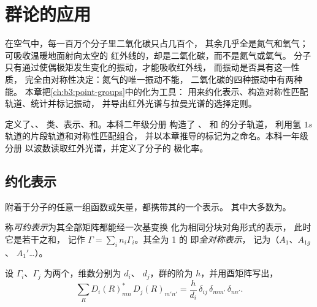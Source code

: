 \chapter{群论的应用}\label{ch:b3:group-theory-applied}

在空气中，每一百万个分子里二氧化碳只占几百个，
其余几乎全是氮气和氧气；可吸收温暖地面射向太空的
红外线的，却是二氧化碳，而不是氮气或氧气。
分子只有通过使偶极矩发生变化的振动，才能吸收红外线，
而振动是否具有这一性质，
完全由对称性决定：氮气的唯一振动不能，
二氧化碳的四种振动中有两种能。
本章把\cref{ch:b3:point-groups}中的化为工具：
用来约化表示、构造对称性匹配轨道、统计并标记振动，
并导出红外光谱与拉曼光谱的选择定则。

\begin{recall}
定义了、、
类、表示、和。本科二年级分册
构造了 、 和  的分子轨道，
利用氢 $1s$ 轨道的片段轨道和对称性匹配组合，
并以本章推导的标记为之命名。本科一年级分册
以波数读取红外光谱，并定义了分子的
极化率。
\end{recall}

\section{约化表示}

附着于分子的任意一组函数或矢量，都携带其的一个表示。
其中大多数为。

\begin{definition}\label{def:b3:group-theory-applied:reducible}
称\emph{可约表示}为其全部矩阵都能经一次基变换
化为相同分块对角形式的表示，
此时它是若干之和，
记作 $\Gamma = \sum_in_i\Gamma_i$。其全为 1 的
即\emph{全对称表示}，
记为（$A_1$、$A_{1g}$、
$A_1'$\dots）。
\end{definition}

\begin{theorem}[大正交定理]\label{thm:b3:group-theory-applied:great-orthogonality}
设 $\Gamma_i$、$\Gamma_j$ 为两个，维数分别为 $d_i$、
$d_j$，群的阶为 $h$，并用酉矩阵写出，
\[
\sum_R D_i(R)_{mn}^*\,D_j(R)_{m'n'} = \frac{h}{d_i}\,\delta_{ij}\,\delta_{mm'}\,\delta_{nn'}.
\]
\end{theorem}
\admitted

